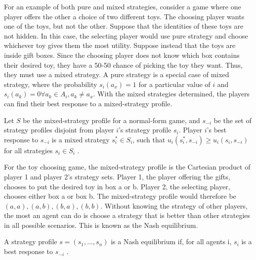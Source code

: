 For an example of both pure and mixed strategies, consider a game where one player offers the other a choice of two different toys. The choosing player wants one of the toys, but not the other. Suppose that the identities of these toys are not hidden. In this case, the selecting player would use pure strategy and choose whichever toy gives them the most utility. Suppose instead that the toys are inside gift boxes. Since the choosing player does not know which box contains their desired toy, they have a 50-50 chance of picking the toy they want. Thus, they must use a mixed strategy. A pure strategy is a special case of mixed strategy, where the probability $s_i(a_x)=1$ for a particular value of $i$ and $s_i(a_k)=0 \forall a_k\in A_i, a_k \neq a_x$. With the mixed strategies determined, the players can find their best response to a mixed-strategy profile.

\begin{define}
  Let $S$ be the mixed-strategy profile for a normal-form game, and $s_{-i}$ be the set of strategy profiles disjoint from player $i$'s strategy profile $s_i$. Player $i$'s best response to $s_{-i}$ is a mixed strategy $s_i^*\in S_i$, such that $u_i(s_i^*,s_{-i}) \ge u_i(s_i, s_{-i})$ for all strategies $s_i\in S_i$ \cite{shoh09}.
\end{define}

For the toy choosing game, the mixed-strategy profile is the Cartesian product of player 1 and player 2's strategy sets. Player 1, the player offering the gifts, chooses to put the desired toy in box a or b. Player 2, the selecting player, chooses either box a or box b. The mixed-strategy profile would therefore be $(a, a), (a, b), (b, a), (b, b)$. Without knowing the strategy of other players, the most an agent can do is choose a strategy that is better than other strategies in all possible scenarios. This is known as the Nash equilibrium.

\begin{define}
  A strategy profile $s=(s_1,\dots ,s_n)$ is a Nash equilibrium if, for all agents i, $s_i$ is a best response to $s_{-i}$ \cite{shoh09}.
\end{define}

